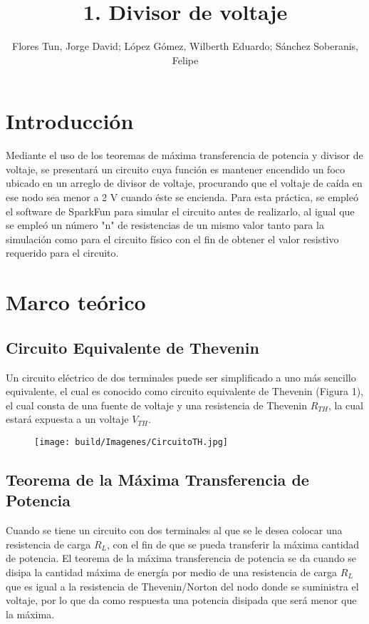 \documentclass[]{article}
\title{1. Divisor de voltaje}
\author{Flores Tun, Jorge David; López Gómez, Wilberth Eduardo; Sánchez Soberanis, Felipe}
\begin{document}
\maketitle

\section{Introducción}

Mediante el uso de los teoremas de máxima transferencia de potencia y divisor de voltaje, se presentará un circuito cuya función es mantener encendido un foco ubicado en un 
arreglo de divisor de voltaje, procurando que el voltaje de caída en ese nodo sea menor a 2 V cuando éste se encienda. Para esta práctica, se empleó el software de SparkFun para 
simular el circuito antes de realizarlo, al igual que se empleó un número "n" de resistencias de un mismo valor tanto para la simulación como para el circuito físico con el fin de 
obtener el valor resistivo requerido para el circuito.

\section{Marco teórico}

\subsection{Circuito Equivalente de Thevenin}

Un circuito eléctrico de dos terminales puede ser simplificado a uno más sencillo equivalente, el cual es conocido como circuito equivalente de Thevenin (Figura 1), 
el cual consta de una fuente de voltaje y una resistencia de Thevenin $R_{TH}$, la cual estará expuesta a un voltaje $V_{TH}$. 

\begin{figure}
    \centering
    \texttt{[image: build/Imagenes/CircuitoTH.jpg]}
\end{figure}

\subsection{Teorema de la Máxima Transferencia de Potencia}

Cuando se tiene un circuito con dos terminales al que se le desea colocar una resistencia de carga $R_L$, con el fin de que se pueda 
transferir la máxima cantidad de potencia. El teorema de la máxima transferencia de potencia se da cuando se disipa la cantidad máxima de energía por medio de una resistencia de carga $R_L$ que es igual a la resistencia de Thevenin/Norton
del nodo donde se suministra el voltaje, por lo que da como respuesta una potencia disipada que será menor que la máxima. 
\end{document}
